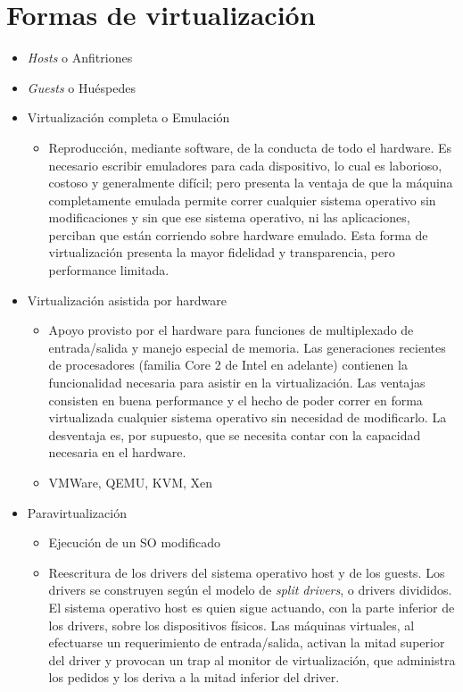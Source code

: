 
\section{Formas de virtualización}
\begin{itemize}
	\item \emph{Hosts} o Anfitriones
	\item \emph{Guests} o Huéspedes
	\item Virtualización completa o Emulación
 	\begin{itemize}
		\item Reproducción, mediante software, de la conducta de todo el hardware. Es necesario escribir emuladores para cada dispositivo, lo cual es laborioso, costoso y generalmente difícil; pero presenta la ventaja de que la máquina completamente emulada permite correr cualquier sistema operativo sin modificaciones y sin que ese sistema operativo, ni las aplicaciones, perciban que están corriendo sobre hardware emulado. Esta forma de virtualización presenta la  mayor fidelidad y transparencia, pero performance limitada.
 	\end{itemize}
 	\item Virtualización asistida por hardware
	\begin{itemize}
		\item Apoyo provisto por el hardware para funciones de multiplexado de entrada/salida y manejo especial de memoria. Las generaciones recientes de procesadores (familia Core 2 de Intel en adelante) contienen la funcionalidad necesaria para asistir en la virtualización. Las ventajas consisten en buena performance y el hecho de poder correr en forma virtualizada cualquier sistema operativo sin necesidad de modificarlo. La desventaja es, por supuesto, que se necesita contar con la capacidad necesaria en el hardware.
 		\item VMWare, QEMU, KVM, Xen
	\end{itemize}
  	\item Paravirtualización
		\begin{itemize}
			\item Ejecución de un SO modificado
 			\item Reescritura de los drivers del sistema operativo host y de los guests. Los drivers se construyen según el modelo de \textit{split drivers}, o drivers divididos. El sistema operativo host es quien sigue actuando, con la parte inferior de los drivers, sobre los dispositivos físicos. Las máquinas virtuales, al efectuarse un requerimiento de entrada/salida, activan la mitad superior del driver y provocan un trap al monitor de virtualización, que administra los pedidos y los deriva a la mitad inferior del driver. 

\end{itemize}
\end{itemize}
